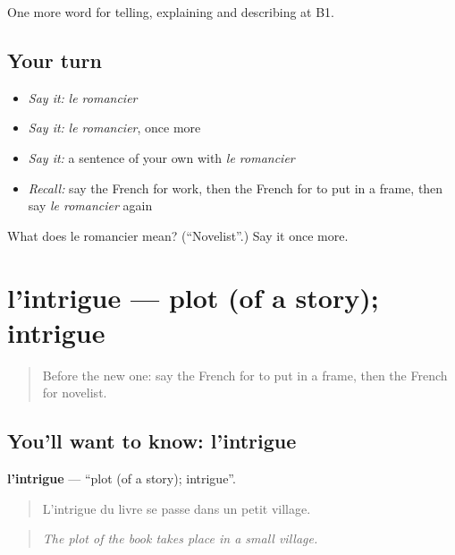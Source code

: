 \begin{grammarlens}[title={What you've built}]
One more word for telling, explaining and describing at B1.
\end{grammarlens}

\subsection*{Your turn}
\begin{itemize}
\raggedright
  \item \emph{Say it:} \emph{le romancier}
  \item \emph{Say it:} \emph{le romancier}, once more
  \item \emph{Say it:} a sentence of your own with \emph{le romancier}
  \item \emph{Recall:} say the French for work, then the French for to put in a frame, then say \emph{le romancier} again
\end{itemize}

\begin{tcolorbox}[breakable,colback=teal!4,colframe=teal!35!black,title={Before you move on}]
What does le romancier mean? (\textquotedblleft{}Novelist\textquotedblright{}.) Say it once more.
\end{tcolorbox}
\section[l'intrigue]{l'intrigue — plot (of a story); intrigue}

\label{lesson:FR-C519-intrigue}



\begin{quote}
Before the new one: say the French for to put in a frame, then the French for novelist.
\end{quote}

\subsection*{You'll want to know: l'intrigue}
\textbf{l'intrigue} — \textquotedblleft{}plot (of a story); intrigue\textquotedblright{}.

\begin{quote}
L'intrigue du livre se passe dans un petit village.
\end{quote}

\begin{quote}
\emph{The plot of the book takes place in a small village.}
\end{quote}

